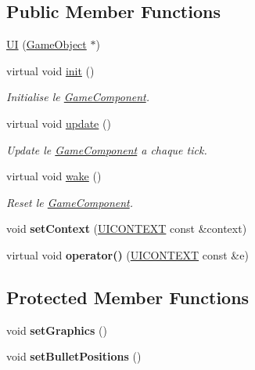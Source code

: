 \subsection*{Public Member Functions}
\begin{DoxyCompactItemize}
\item 
\hyperlink{class_u_i_ab299e77b21896655f94ef84c727a4e22}{UI} (\hyperlink{class_game_object}{Game\+Object} $\ast$)
\item 
\hypertarget{class_u_i_a2277decc2cba013de2fbb5a64fbc1543}{}\label{class_u_i_a2277decc2cba013de2fbb5a64fbc1543} 
virtual void \hyperlink{class_u_i_a2277decc2cba013de2fbb5a64fbc1543}{init} ()
\begin{DoxyCompactList}\small\item\em Initialise le \hyperlink{class_game_component}{Game\+Component}. \end{DoxyCompactList}\item 
\hypertarget{class_u_i_a47c96192a9924bbd6c6b610922770988}{}\label{class_u_i_a47c96192a9924bbd6c6b610922770988} 
virtual void \hyperlink{class_u_i_a47c96192a9924bbd6c6b610922770988}{update} ()
\begin{DoxyCompactList}\small\item\em Update le \hyperlink{class_game_component}{Game\+Component} a chaque tick. \end{DoxyCompactList}\item 
\hypertarget{class_u_i_ae16be0e89513445e6a75e7cd92ba6d90}{}\label{class_u_i_ae16be0e89513445e6a75e7cd92ba6d90} 
virtual void \hyperlink{class_u_i_ae16be0e89513445e6a75e7cd92ba6d90}{wake} ()
\begin{DoxyCompactList}\small\item\em Reset le \hyperlink{class_game_component}{Game\+Component}. \end{DoxyCompactList}\item 
\hypertarget{class_u_i_a103e73ecc7a0e62c01d1c21f5bcc0fe7}{}\label{class_u_i_a103e73ecc7a0e62c01d1c21f5bcc0fe7} 
void {\bfseries set\+Context} (\hyperlink{struct_u_i_c_o_n_t_e_x_t}{U\+I\+C\+O\+N\+T\+E\+XT} const \&context)
\item 
\hypertarget{class_u_i_a7a1beee6c64d0fce1f6e4dc720b08ea3}{}\label{class_u_i_a7a1beee6c64d0fce1f6e4dc720b08ea3} 
virtual void {\bfseries operator()} (\hyperlink{struct_u_i_c_o_n_t_e_x_t}{U\+I\+C\+O\+N\+T\+E\+XT} const \&e)
\end{DoxyCompactItemize}
\subsection*{Protected Member Functions}
\begin{DoxyCompactItemize}
\item 
\hypertarget{class_u_i_a2f93274796ee43d83145b042b1844b93}{}\label{class_u_i_a2f93274796ee43d83145b042b1844b93} 
void {\bfseries set\+Graphics} ()
\item 
\hypertarget{class_u_i_a626a653f29b66e351efe58085001ad87}{}\label{class_u_i_a626a653f29b66e351efe58085001ad87} 
void {\bfseries set\+Bullet\+Positions} ()
\end{DoxyCompactItemize}
